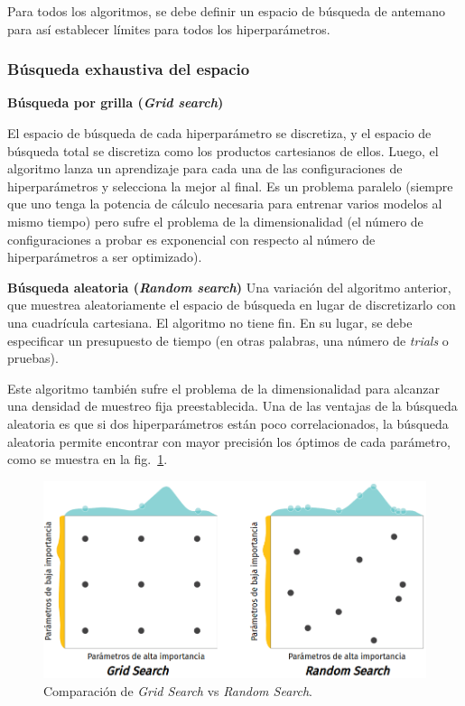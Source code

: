\documentclass[a4paper,12pt]{article}
\begin{document}
Para todos los algoritmos, se debe definir un espacio de búsqueda de antemano para así establecer límites para todos los hiperparámetros.

\subsubsection{Búsqueda exhaustiva del espacio}
\textbf{Búsqueda por grilla (\textit{Grid search})}

El espacio de búsqueda de cada hiperparámetro se discretiza, y el espacio de búsqueda total se discretiza como los productos cartesianos de ellos. Luego, el algoritmo lanza un aprendizaje para cada una de las configuraciones de hiperparámetros y selecciona la mejor al final. Es un problema paralelo (siempre que uno tenga la potencia de cálculo necesaria para entrenar varios modelos al mismo tiempo) pero sufre el problema de la dimensionalidad (el número de configuraciones a probar es exponencial con respecto al número de hiperparámetros a ser optimizado).

\textbf{Búsqueda aleatoria (\textit{Random search})}
Una variación del algoritmo anterior, que muestrea aleatoriamente el espacio de búsqueda en lugar de discretizarlo con una cuadrícula cartesiana. El algoritmo no tiene fin. En su lugar, se debe especificar un presupuesto de tiempo (en otras palabras, una número de \textit{trials} o pruebas). 

Este algoritmo también sufre el problema de la dimensionalidad para alcanzar una densidad de muestreo fija preestablecida. Una de las ventajas de la búsqueda aleatoria es que si dos hiperparámetros están poco correlacionados, la búsqueda aleatoria permite encontrar con mayor precisión los óptimos de cada parámetro, como se muestra en la fig.~\ref{fig:grid_vs_search}. 

\begin{figure}[H]
	\begin{center}
		\includegraphics[width=1\textwidth]{grid_vs_search_v4.png}
		\caption{Comparación de \textit{Grid Search} vs \textit{Random Search}.}
		\label{fig:grid_vs_search}
	\end{center}
\end{figure}
\end{document}
